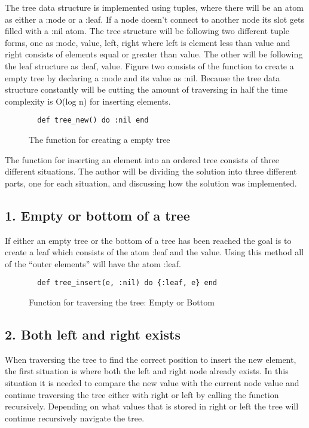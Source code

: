 \documentclass[a4paper,11pt]{article}
\begin{document}
The tree data structure is implemented using tuples, where there will be an atom as either a :node or a :leaf. If a node doesn't connect to another node its slot gets filled with a :nil atom. The tree structure will be following two different tuple forms, one as {:node, value, left, right} where left is element less than value and right consists of elements equal or greater than value. The other will be following the leaf structure as {:leaf, value}. Figure two consists of the function to create a empty tree by declaring a :node and its value as :nil. Because the tree data structure constantly will be cutting the amount of traversing in half the time complexity is O(log n) for inserting elements.

\begin{figure}[H]
\begin{verbatim}
  def tree_new() do :nil end
\end{verbatim}
\caption{The function for creating a empty tree}
\label{Figure:2}
\end{figure}

The function for inserting an element into an ordered tree consists of three different situations. The author will be dividing the solution into three different parts, one for each situation, and discussing how the solution was implemented.

\subsection*{1. Empty or bottom of a tree}
If either an empty tree or the bottom of a tree has been reached the goal is to create a leaf which consists of the atom :leaf and the value. Using this method all of the “outer elements” will have the atom :leaf.

\begin{figure}[H]
\begin{verbatim}
  def tree_insert(e, :nil) do {:leaf, e} end
\end{verbatim}
\caption{Function for traversing the tree: Empty or Bottom}
\label{Figure:3}
\end{figure}


\subsection*{2. Both left and right exists}
When traversing the tree to find the correct position to insert the new element, the first situation is where both the left and right node already exists. In this situation it is needed to compare the new value with the current node value and continue traversing the tree either with right or left by calling the function recursively. Depending on what values that is stored in right or left the tree will continue recursively navigate the tree.
\end{document}
